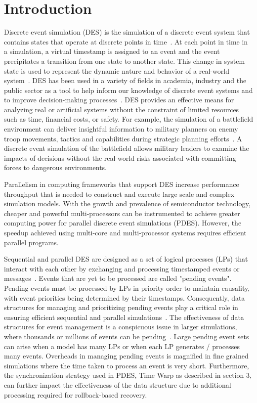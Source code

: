 \section{Introduction}
	Discrete event simulation (DES) is the simulation of a discrete event system that contains states that operate at discrete points in time~\cite{fishman-13}. At each point in time in a simulation, a virtual timestamp is assigned to an event and the event precipitates a transition from one state to another state. This change in system state is used to represent the dynamic nature and behavior of a real-world system~\cite{fujimoto-90}. DES has been used in a variety of fields in academia, industry and the public sector as a tool to help inform our knowledge of discrete event systems and to improve decision-making processes~\cite{fishman-13}. DES provides an effective means for analyzing real or artificial systems without the constraint of limited resources such as time, financial costs, or safety. For example, the simulation of a battlefield environment can deliver insightful information to military planners on enemy troop movements, tactics and capabilities during strategic planning efforts~\cite{hill-01}. A discrete event simulation of the battlefield allows military leaders to examine the impacts of decisions without the real-world risks associated with committing forces to dangerous environments. 
    
	Parallelism in computing frameworks that support DES increase performance throughput that is needed to construct and execute large scale and complex simulation models. With the growth and prevalence of semiconductor technology, cheaper and powerful multi-processors can be instrumented to achieve greater computing power for parallel discrete event simulations (PDES). However, the speedup achieved using multi-core and multi-processor systems requires efficient parallel programs. 
    
    Sequential and parallel DES are designed as a set of logical processes (LPs) that interact with each other by exchanging and processing timestamped events or messages~\cite{jafer-13}. Events that are yet to be processed are called "pending events". Pending events must be processed by LPs in priority order to maintain causality, with event priorities being determined by their timestamps. Consequently, data structures for managing and prioritizing pending events play a critical role in ensuring efficient sequential and parallel simulations~\cite{jones-86,ronngren-97,brown-88,franceschini-15}. The effectiveness of data structures for event management is a conspicuous issue in larger simulations, where thousands or millions of events can be pending~\cite{carothers-2010,yeom-14}. Large pending event sets can arise when a model has many LPs or when each LP generates / processes many events. Overheads in managing pending events is magnified in fine grained simulations where the time taken to process an event is very short. Furthermore, the synchronization strategy used in PDES, Time Warp as described in section 3, can further impact the effectiveness of the data structure due to additional processing required for rollback-based recovery.
    
